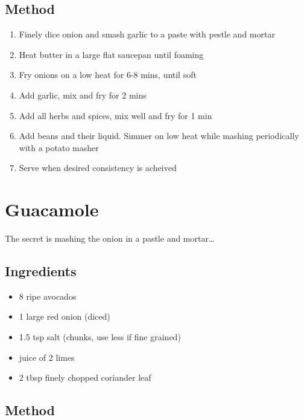 \documentclass[
]{book}
\providecommand{\tightlist}{%
  \setlength{\itemsep}{0pt}\setlength{\parskip}{0pt}}
\begin{document}
\hypertarget{method}{%
\section{Method}\label{method}}

\begin{enumerate}
\def\labelenumi{\arabic{enumi}.}
\tightlist
\item
  Finely dice onion and smash garlic to a paste with pestle and mortar
\item
  Heat butter in a large flat saucepan until foaming
\item
  Fry onions on a low heat for 6-8 mins, until soft
\item
  Add garlic, mix and fry for 2 mins
\item
  Add all herbs and spices, mix well and fry for 1 min
\item
  Add beans and their liquid. Simmer on low heat while mashing periodically with a potato masher
\item
  Serve when desired consistency is acheived
\end{enumerate}

\hypertarget{guacamole}{%
\chapter{Guacamole}\label{guacamole}}

The secret is mashing the onion in a pastle and mortar\ldots{}

\hypertarget{ingredients-1}{%
\section{Ingredients}\label{ingredients-1}}

\begin{itemize}
\tightlist
\item
  8 ripe avocados
\item
  1 large red onion (diced)
\item
  1.5 tsp salt (chunks, use less if fine grained)
\item
  juice of 2 limes
\item
  2 tbsp finely chopped coriander leaf
\end{itemize}

\hypertarget{method-1}{%
\section{Method}\label{method-1}}
\end{document}
